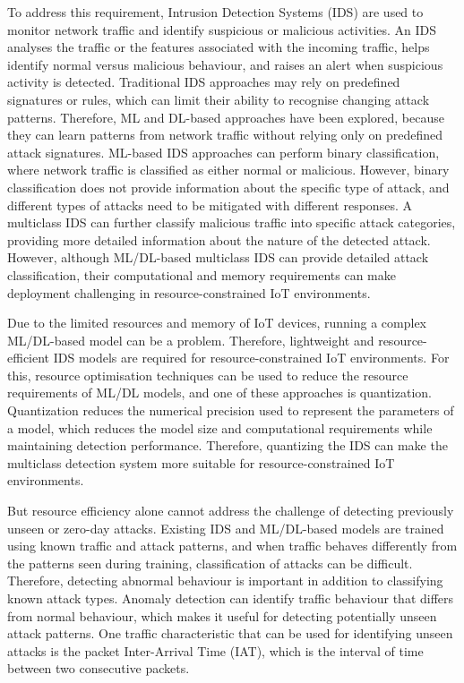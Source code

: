 \documentclass[]{interact}
\theoremstyle{plain}
\theoremstyle{definition}
\begin{document}
To address this requirement, Intrusion Detection Systems (IDS) are used to monitor network traffic and identify suspicious or malicious activities. An IDS analyses the traffic or the features associated with the incoming traffic\cite{abdulganiyu2023systematic}, helps identify normal versus malicious behaviour, and raises an alert when suspicious activity is detected. Traditional IDS approaches may rely on predefined signatures or rules, which can limit their ability to recognise changing attack patterns\cite{khraisat2019survey}. Therefore, ML and DL-based approaches have been explored, because they can learn patterns from network traffic without relying only on predefined attack signatures\cite{rakine2025comprehensive}. ML-based IDS approaches can perform binary classification, where network traffic is classified as either normal or malicious. However, binary classification does not provide information about the specific type of attack\cite{palshikar2022distinguishes}, and different types of attacks need to be mitigated with different responses. A multiclass IDS can further classify malicious traffic into specific attack categories, providing more detailed information about the nature of the detected attack. However, although ML/DL-based multiclass IDS can provide detailed attack classification, their computational and memory requirements can make deployment challenging in resource-constrained IoT environments\cite{mallidi2025advancements}.

Due to the limited resources and memory of IoT devices, running a complex ML/DL-based model can be a problem. Therefore, lightweight and resource-efficient IDS models are required for resource-constrained IoT environments\cite{arshad2020intrusion}. For this, resource optimisation techniques can be used to reduce the resource requirements of ML/DL models, and one of these approaches is quantization\cite{gholami2022survey}. Quantization reduces the numerical precision used to represent the parameters of a model, which reduces the model size and computational requirements while maintaining detection performance. Therefore, quantizing the IDS can make the multiclass detection system more suitable for resource-constrained IoT environments\cite{misrak2025lightweight}.

But resource efficiency alone cannot address the challenge of detecting previously unseen or zero-day attacks\cite{el2024advanced}. Existing IDS and ML/DL-based models are trained using known traffic and attack patterns, and when traffic behaves differently from the patterns seen during training\cite{sabeel2021building}, classification of attacks can be difficult. Therefore, detecting abnormal behaviour is important in addition to classifying known attack types. Anomaly detection can identify traffic behaviour that differs from normal behaviour, which makes it useful for detecting potentially unseen attack patterns. One traffic characteristic that can be used for identifying unseen attacks is the packet Inter-Arrival Time (IAT), which is the interval of time between two consecutive packets\cite{sahin2025leveraging}.
\end{document}
